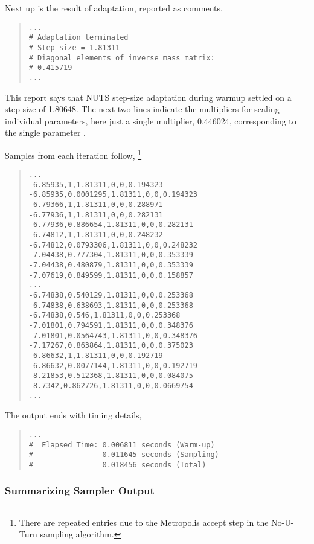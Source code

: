 Next up is the result of adaptation, reported as comments.
%
\begin{quote}
\begin{Verbatim}[fontsize=\small]
...
# Adaptation terminated
# Step size = 1.81311
# Diagonal elements of inverse mass matrix:
# 0.415719
...
\end{Verbatim}
\end{quote}
%
This report says that NUTS step-size adaptation during warmup
settled on a step size of 1.80648.  The next two lines
indicate the multipliers for scaling individual parameters, here
just a single multiplier, 0.446024, corresponding to the single
parameter .

Samples from each iteration follow,%
%
\footnote{There are repeated entries due to the Metropolis accept step
in the No-U-Turn sampling algorithm.}
%
%
\begin{quote}
\begin{Verbatim}[fontsize=\small]
...
-6.85935,1,1.81311,0,0,0.194323
-6.85935,0.0001295,1.81311,0,0,0.194323
-6.79366,1,1.81311,0,0,0.288971
-6.77936,1,1.81311,0,0,0.282131
-6.77936,0.886654,1.81311,0,0,0.282131
-6.74812,1,1.81311,0,0,0.248232
-6.74812,0.0793306,1.81311,0,0,0.248232
-7.04438,0.777304,1.81311,0,0,0.353339
-7.04438,0.480879,1.81311,0,0,0.353339
-7.07619,0.849599,1.81311,0,0,0.158857
...
-6.74838,0.540129,1.81311,0,0,0.253368
-6.74838,0.638693,1.81311,0,0,0.253368
-6.74838,0.546,1.81311,0,0,0.253368
-7.01801,0.794591,1.81311,0,0,0.348376
-7.01801,0.0564743,1.81311,0,0,0.348376
-7.17267,0.863864,1.81311,0,0,0.375023
-6.86632,1,1.81311,0,0,0.192719
-6.86632,0.0077144,1.81311,0,0,0.192719
-8.21853,0.512368,1.81311,0,0,0.084075
-8.7342,0.862726,1.81311,0,0,0.0669754
...
\end{Verbatim}
\end{quote}
%

The output ends with timing details,%
\begin{quote}
\begin{Verbatim}[fontsize=\small]
...
#  Elapsed Time: 0.006811 seconds (Warm-up)
#                0.011645 seconds (Sampling)
#                0.018456 seconds (Total)
\end{Verbatim}
\end{quote}

\subsubsection{Summarizing Sampler Output}

